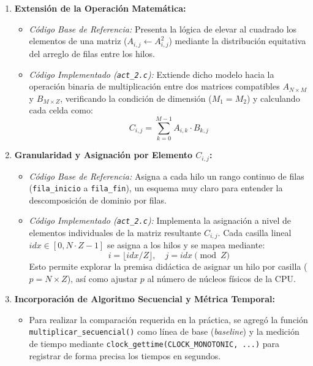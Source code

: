 \documentclass[runningheads]{llncs}
\begin{document}
\begin{enumerate}
    \item \textbf{Extensión de la Operación Matemática:}
    \begin{itemize}
        \item \textit{Código Base de Referencia:} Presenta la lógica de elevar al cuadrado los elementos de una matriz ($A_{i,j} \leftarrow A_{i,j}^2$) mediante la distribución equitativa del arreglo de filas entre los hilos.
        \item \textit{Código Implementado (\texttt{act\_2.c}):} Extiende dicho modelo hacia la operación binaria de multiplicación entre dos matrices compatibles $A_{N \times M}$ y $B_{M \times Z}$, verificando la condición de dimensión ($M_1 = M_2$) y calculando cada celda como:
        \begin{equation}
            C_{i,j} = \sum_{k=0}^{M-1} A_{i,k} \cdot B_{k,j}
        \end{equation}
    \end{itemize}

    \item \textbf{Granularidad y Asignación por Elemento $C_{i,j}$:}
    \begin{itemize}
        \item \textit{Código Base de Referencia:} Asigna a cada hilo un rango continuo de filas (\texttt{fila\_inicio} a \texttt{fila\_fin}), un esquema muy claro para entender la descomposición de dominio por filas.
        \item \textit{Código Implementado (\texttt{act\_2.c}):} Implementa la asignación a nivel de elementos individuales de la matriz resultante $C_{i,j}$. Cada casilla lineal $idx \in [0, N \cdot Z - 1]$ se asigna a los hilos y se mapea mediante:
        \begin{equation}
            i = \lfloor idx / Z \rfloor, \quad j = idx \pmod Z
        \end{equation}
        Esto permite explorar la premisa didáctica de asignar un hilo por casilla ($p = N \times Z$), así como ajustar $p$ al número de núcleos físicos de la CPU.
    \end{itemize}

    \item \textbf{Incorporación de Algoritmo Secuencial y Métrica Temporal:}
    \begin{itemize}
        \item Para realizar la comparación requerida en la práctica, se agregó la función \texttt{multiplicar\_secuencial()} como línea de base (\textit{baseline}) y la medición de tiempo mediante \texttt{clock\_gettime(CLOCK\_MONOTONIC, ...)} para registrar de forma precisa los tiempos en segundos.
    \end{itemize}
\end{enumerate}
\end{document}
